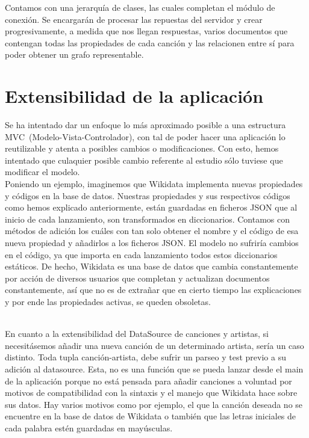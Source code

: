 Contamos con una jerarquía de clases, las cuales completan el módulo de conexión. Se encargarán de procesar las repuestas del servidor y crear progresivamente, a medida que nos llegan respuestas, varios documentos que contengan todas las propiedades de cada canción y las relacionen entre sí para poder obtener un grafo representable.\\

\section{Extensibilidad de la aplicación}

Se ha intentado dar un enfoque lo más aproximado posible a una estructura MVC~(Modelo-Vista-Controlador), con tal de poder hacer una aplicación lo reutilizable y atenta a posibles cambios o modificaciones. Con esto, hemos intentado que culaquier posible cambio referente al estudio sólo tuviese que modificar el modelo.\\

Poniendo un ejemplo, imaginemos que Wikidata implementa nuevas propiedades y códigos en la base de datos. Nuestras propiedades y sus respectivos códigos como hemos explicado anteriormente, están guardadas en ficheros JSON que al inicio de cada lanzamiento, son transformados en diccionarios. Contamos con métodos de adición los cuáles con tan solo obtener el nombre y el código de esa nueva propiedad y añadirlos a los ficheros JSON. El modelo no sufriría cambios en el código, ya que importa en cada lanzamiento todos estos diccionarios estáticos. De hecho, Wikidata es una base de datos que cambia constantemente por acción de diversos usuarios que completan y actualizan documentos constantemente, así que no es de extrañar que en cierto tiempo las explicaciones y por ende las propiedades activas, se queden obsoletas.\\\

En cuanto a la extensibilidad del DataSource de canciones y artistas, si necesitásemos añadir una nueva canción de un determinado artista, sería un caso distinto. Toda tupla canción-artista, debe sufrir un parseo y test previo a su adición al datasource. Esta, no es una función que se pueda lanzar desde el main de la aplicación porque no está pensada para añadir canciones a voluntad por motivos de compatibilidad con la sintaxis y el manejo que Wikidata hace sobre sus datos. Hay varios motivos como por ejemplo, el que la canción deseada no se encuentre en la base de datos de Wikidata o también que las letras iniciales de cada palabra estén guardadas en mayúsculas.\\

